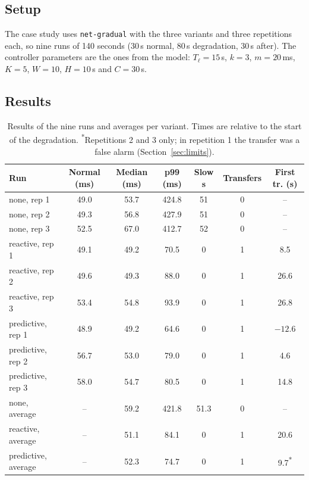 \documentclass[11pt,a4paper]{article}
\begin{document}
\subsection{Setup}

The case study uses \texttt{net-gradual} with the three variants and three repetitions each, so nine runs of 140 seconds (30\,s normal, 80\,s degradation, 30\,s after). The controller parameters are the ones from the model: $T_\ell = 15$\,s, $k = 3$, $m = 20$\,ms, $K = 5$, $W = 10$, $H = 10$\,s and $C = 30$\,s.

\subsection{Results}

\begin{table}[H]
\centering
\small
\begin{tabular}{lcccccc}
\toprule
Run & Normal (ms) & Median (ms) & p99 (ms) & Slow s & Transfers & First tr. (s) \\
\midrule
none, rep 1       & 49.0 & 53.7 & 424.8 & 51 & 0 & -- \\
none, rep 2       & 49.3 & 56.8 & 427.9 & 51 & 0 & -- \\
none, rep 3       & 52.5 & 67.0 & 412.7 & 52 & 0 & -- \\
reactive, rep 1   & 49.1 & 49.2 & 70.5  & 0  & 1 & 8.5 \\
reactive, rep 2   & 49.6 & 49.3 & 88.0  & 0  & 1 & 26.6 \\
reactive, rep 3   & 53.4 & 54.8 & 93.9  & 0  & 1 & 26.8 \\
predictive, rep 1 & 48.9 & 49.2 & 64.6  & 0  & 1 & $-12.6$ \\
predictive, rep 2 & 56.7 & 53.0 & 79.0  & 0  & 1 & 4.6 \\
predictive, rep 3 & 58.0 & 54.7 & 80.5  & 0  & 1 & 14.8 \\
\midrule
none, average       & -- & 59.2 & 421.8 & 51.3 & 0 & -- \\
reactive, average   & -- & 51.1 & 84.1  & 0    & 1 & 20.6 \\
predictive, average & -- & 52.3 & 74.7  & 0    & 1 & 9.7\textsuperscript{*} \\
\bottomrule
\end{tabular}
\caption{Results of the nine runs and averages per variant. Times are relative to the start of the degradation. \textsuperscript{*}Repetitions 2 and 3 only; in repetition 1 the transfer was a false alarm (Section~\ref{sec:limits}).}
\label{tab:runs}
\end{table}
\end{document}

